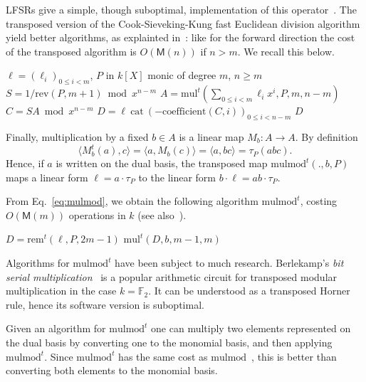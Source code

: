 \documentclass[12pt]{article}
\def\M {\ensuremath{\mathsf{M}}}
\def\F {\ensuremath{\mathbb{F}}}
\def\mul {\ensuremath{\mathrm{mul}}}
\def\rem {\ensuremath{\mathrm{rem}}}
\def\cat {\ensuremath{\mathrm{cat}}}
\def\coeff {\ensuremath{\mathrm{coefficient}}}
\def\mulmod {\ensuremath{\mathrm{mulmod}}}
\def\rev {\ensuremath{\mathrm{rev}}}
\newcommand{\ang}[1]{\langle#1\rangle}
\begin{document}
LFSRs give a simple, though suboptimal, implementation of this
operator~\cite{todo}. The transposed version of the
Cook-Sieveking-Kung fast Euclidean division algorithm yield better
algorithms, as explainted in~\cite{bostan+lecerf+schost:tellegen}:
like for the forward direction the cost of the transposed algorithm is
$O(\M(n))$ if $n>m$. We recall this below.

\begin{algorithm}[H]
  \caption{$\rem^t(\ell,P,k)$}
  \begin{algorithmic}[1]
    \REQUIRE $\ell=(\ell_i)_{0 \le i < m}$, $P$ in $k[X]$ monic of degree $m$, $n \ge m$
    \STATE $S = 1/\rev(P, m+1) \bmod x^{n-m}$
    \STATE $A = \mul^t( \sum_{0 \le i < m} \ell_{i}x^i, P, m, n-m)$
    \STATE $C = S A \bmod x^{n-m}$
    \STATE $D = \ell ~\cat~ (-\coeff(C,i))_{0 \le i < n-m}$
    \RETURN $D$
  \end{algorithmic}
\end{algorithm}

Finally, multiplication by a fixed $b\in A$ is a linear map $M_b:A\to
A$. By definition
\begin{equation}
  \label{eq:mulmodt-def}
  \ang{M_b^t(a),c} = \ang{a,M_b(c)} = \ang{a,bc} = \tau_P(abc).
\end{equation}
Hence, if $a$ is written on the dual basis, the transposed map
$\mulmod^t(.,b,P)$ maps a linear form $\ell = a\cdot\tau_P$ to the
linear form $b \cdot \ell=ab\cdot\tau_P$.  

From Eq.~\eqref{eq:mulmod},
we obtain the following algorithm $\mulmod^t$, costing $O(\M(m))$
operations in $k$ (see
also~\cite{shoup99,bostan+lecerf+schost:tellegen}).


\begin{algorithm}[H]
  \caption{$\mulmod^t(\ell,b,P)$}
  \begin{algorithmic}[1]
    \STATE $D = \rem^t(\ell,P,2m-1)$
    \RETURN $\mul^t(D, b, m-1, m)$
  \end{algorithmic}
\end{algorithm}

Algorithms for $\mulmod^t$ have been subject to much
research. Berlekamp's \emph{bit serial multiplication}~\cite{todo} is
a popular arithmetic circuit for transposed modular multiplication in
the case $k=\F_2$. It can be understood as a transposed Horner
rule, hence its software version is suboptimal.

Given an algorithm for $\mulmod^t$ one can multiply two elements
represented on the dual basis by converting one to the monomial basis,
and then applying $\mulmod^t$. Since $\mulmod^t$ has the same cost as
$\mulmod$~\cite{shoup99,bostan+lecerf+schost:tellegen}, this is better
than converting both elements to the monomial basis.
\end{document}
